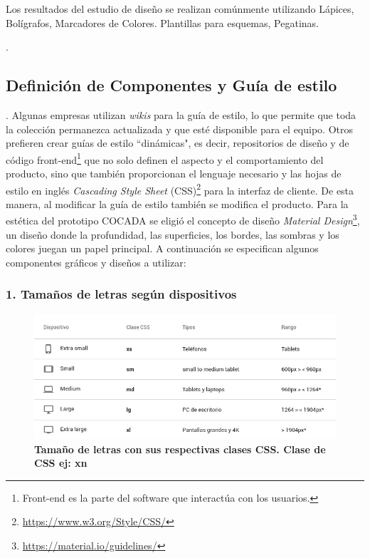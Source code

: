 Los resultados del estudio de diseño se realizan comúnmente utilizando Lápices, Bolígrafos, Marcadores de Colores. Plantillas para esquemas, Pegatinas.

\citep{Gothelf2013}.


\clearpage
\subsection{Definición de Componentes y Guía de estilo}
\citep{Gothelf2013}. Algunas empresas utilizan \textit{wikis} para la guía de estilo, lo que permite que toda la colección permanezca actualizada y que esté disponible para el equipo. Otros prefieren crear guías de estilo ``dinámicas", es decir, repositorios de diseño y de código front-end\footnote{Front-end es la parte del software que interactúa con los usuarios.} que no solo definen el aspecto y el comportamiento del producto, sino que también proporcionan el lenguaje necesario y las hojas de estilo en inglés \textit{Cascading Style Sheet} (CSS)\footnote{\url{https://www.w3.org/Style/CSS/}} para la interfaz de cliente. De esta manera, al modificar la guía de estilo también se modifica el producto.
Para la estética del prototipo COCADA se eligió el concepto de diseño \textit{Material Design}\footnote{\url{https://material.io/guidelines/}}, un diseño donde la profundidad, las superficies, los bordes, las sombras y los colores juegan un papel principal. A continuación se especifican algunos componentes gráficos y diseños a utilizar:


\subsubsection{1. Tamaños de letras según dispositivos}
    \begin{figure}[h]
    \includegraphics[width=12cm]{Img/UX/guia1.jpg}
    \centering
    \caption{\textbf{ \footnotesize{Tamaño de letras con sus respectivas clases CSS. Clase de CSS ej: xn}}}
\end{figure} 
    
